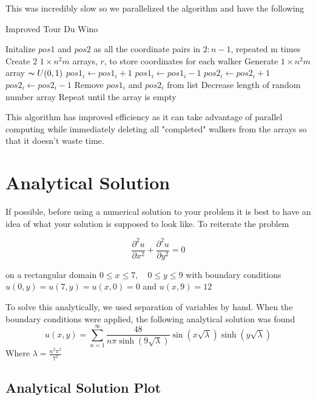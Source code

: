 \documentclass{amsart}
\begin{document}
This was incredibly slow so we parallelized the algorithm and have the following
\begin{algorithm}
	\caption{Improved Tour Du Wino}
	\begin{algorithmic}[1]
		\State Initalize $pos1$ and $pos2$ as all the coordinate pairs in $2:n-1$, repeated m  times
		\State Create 2 $1 \times n^2m$ arrays, $r$, to store coordinates for each walker
		\State Generate $1 \times n^2m$ array $\thicksim U(0,1)$
			\State $pos1_i \gets pos1_i + 1$
			\State $pos1_i \gets pos1_i - 1$
			\State $pos2_i \gets pos2_i + 1$
		\Else
			\State $pos2_i \gets pos2_i - 1$
		\EndIf
			\State Remove $pos1_i$ and $pos2_i$ from list
			\State Decrease length of random number array
		\EndIf
		\State Repeat until the array is empty
	\end{algorithmic}
\end{algorithm}

This algorithm has improved efficiency as it can take advantage of parallel computing while immediately deleting all "completed" walkers from the arrays so that it doesn't waste time.
\section{Analytical Solution}

If possible, before using a numerical solution to your problem it is best to have an idea of what your solution is supposed to look like. To reiterate the problem

	$$\frac{\partial^2 u}{\partial x^2} + \frac{\partial^2 u}{\partial y^2} = 0$$

on a rectangular domain $0 \leq x \leq 7, \quad 0 \leq y \leq 9$ with boundary conditions $u(0,y) = u(7,y) = u(x,0) = 0$ and $u(x,9) = 12$ 

To solve this analytically, we used separation of variables by hand. When the boundary conditions were applied, the following analytical solution was found
\begin{equation}
    u(x,y)= \sum _{n=1}^{\infty} \frac{48}{n \pi \sinh(9 \sqrt{\lambda})} \sin(x \sqrt{\lambda}) \sinh(y \sqrt{\lambda})
\end{equation}
Where $\lambda=\frac{n^2 \pi ^2}{7^2}$

\subsection{Analytical Solution Plot} 
\end{document}
